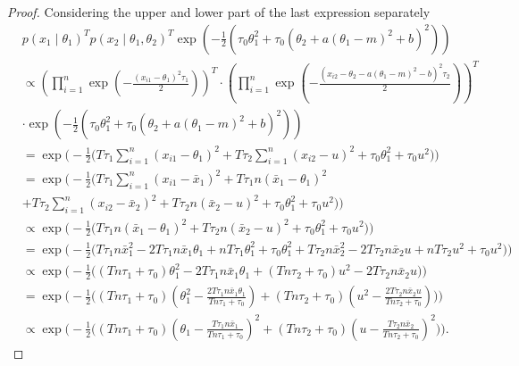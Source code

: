 \documentclass[english,twoside,openright]{HYgraduMLDS}
\begin{document}
\begin{appendices}
\begin{proof}
    Considering the upper and lower part of the last expression separately
    \begin{align*}
        &p(x_1\mid \theta_1)^Tp(x_2\mid \theta_1, \theta_2)^T
        \exp\left(-\frac{1}{2}\left(\tau_0\theta_1^2
        + \tau_0(\theta_2 + a(\theta_1 - m)^2 + b)^2\right)\right)
        \\&\propto \left(\prod_{i=1}^n \exp
        \left(-\frac{(x_{i1} - \theta_1)^2\tau_1}{2}\right)\right)^T
        \cdot\left(\prod_{i=1}^n \exp\left(-\frac{(x_{i2} - \theta_2
        - a(\theta_1 - m)^2 - b)^2\tau_2}{2}\right)\right)^T
        \\&\cdot \exp\left(-\frac{1}{2}\left(\tau_0\theta_1^2
        + \tau_0(\theta_2 + a(\theta_1 - m)^2 + b)^2\right)\right)
        \\&=\exp\Bigg(-\frac{1}{2}\Big(T\tau_1\sum_{i=1}^n
        (x_{i1} - \theta_1)^2
        + T\tau_2\sum_{i=1}^n(x_{i2} - u)^2
        + \tau_0\theta_1^2 + \tau_0 u^2\Big)\Bigg)
        \\&=\exp\Bigg(-\frac{1}{2}\Big(T\tau_1\sum_{i=1}^n
        (x_{i1} - \bar{x}_1)^2 + T\tau_1n(\bar{x}_1 - \theta_1)^2
        \\&+ T\tau_2\sum_{i=1}^n (x_{i2}  - \bar{x}_2)^2 + T\tau_2n(\bar{x}_2 - u)^2
        + \tau_0\theta_1^2 + \tau_0 u^2\Big)\Bigg)
        \\&\propto\exp\Bigg(-\frac{1}{2}\Big(T\tau_1n(\bar{x}_1 - \theta_1)^2
        + T\tau_2n(\bar{x}_2 - u)^2
        + \tau_0\theta_1^2 + \tau_0 u^2\Big)\Bigg)
        \\&=\exp\Bigg(-\frac{1}{2}\Big(T\tau_1n\bar{x}_1^2
        - 2T\tau_1n\bar{x}_1\theta_1 + nT\tau_1\theta_1^2 + \tau_0\theta_1^2
        + T\tau_2n\bar{x}_2^2 - 2T\tau_2n\bar{x}_2u + nT\tau_2u^2
        + \tau_0 u^2\Big)\Bigg)
        \\&\propto\exp\Bigg(-\frac{1}{2}\Big((Tn\tau_1 + \tau_0)\theta_1^2
        - 2T\tau_1n\bar{x}_1\theta_1
        + (Tn\tau_2 + \tau_0)u^2 - 2T\tau_2n\bar{x}_2u \Big)\Bigg)
        \\&=\exp\Bigg(-\frac{1}{2}\Big((Tn\tau_1 + \tau_0)\left(\theta_1^2
        - \frac{2T\tau_1n\bar{x}_1\theta_1}{Tn\tau_1 + \tau_0} \right)
        + (Tn\tau_2 + \tau_0)\left(u^2 - \frac{2T\tau_2n\bar{x}_2u}
        {Tn\tau_2 + \tau_0}\right) \Big)\Bigg)
        \\&\propto\exp\Bigg(-\frac{1}{2}\Big(
        (Tn\tau_1 + \tau_0)\left(\theta_1
        - \frac{T\tau_1n\bar{x}_1}{Tn\tau_1 + \tau_0} \right)^2
        + (Tn\tau_2 + \tau_0)\left(u - \frac{T\tau_2n\bar{x}_2}
        {Tn\tau_2 + \tau_0}\right)^2 \Big)\Bigg).

\end{align*}
\end{proof}
\end{appendices}
\end{document}
